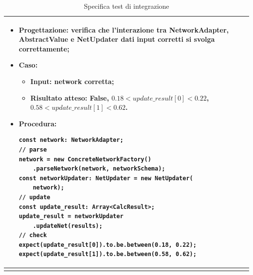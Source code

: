 \begin{longtable}{|C{2.5cm}|C{13cm}|}
	\begin{itemize}
		\item \textbf{Progettazione}: verifica che l'interazione tra NetworkAdapter, AbstractValue e NetUpdater dati input corretti si svolga correttamente;
		\item \textbf{Caso}: 
		\begin{itemize}
			\item \textbf{Input}: network corretta;
			\item \textbf{Risultato atteso}: False, \newline $0.18 < update\_result[0] < 0.22$, \newline $0.58 < update\_result[1] < 0.62$.
		\end{itemize}
		\item \textbf{Procedura}:
		\begin{lstlisting}
const network: NetworkAdapter;
// parse
network = new ConcreteNetworkFactory()
	.parseNetwork(network, networkSchema);
const networkUpdater: NetUpdater = new NetUpdater(
	network);
// update
const update_result: Array<CalcResult>;
update_result = networkUpdater
	.updateNet(results);
// check
expect(update_result[0]).to.be.between(0.18, 0.22);
expect(update_result[1]).to.be.between(0.58, 0.62);
		\end{lstlisting}
	\end{itemize} \\		
	\hline
	\caption{Specifica test di integrazione}
	\label{tabella:specifica ti}
\end{longtable}
\renewcommand{\arraystretch}{1}
\newpage


